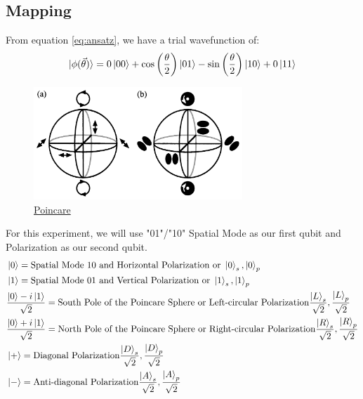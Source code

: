 \documentclass{article}
\begin{document}
\subsection{Mapping}
From equation \eqref{eq:ansatz}, we have a trial wavefunction of:
\begin{equation}
	|\phi(\vec{\theta})\rangle = 0\ket{00} + \cos\left(\frac{\theta}{2}\right)|01\rangle - \sin\left(\frac{\theta}{2}\right)|10\rangle + 0\ket{11}
\end{equation}
\begin{figure}[H]
	\centering
	\includegraphics[width=0.7\textwidth, height=0.3\textheight]{poincare.jpeg}
	\caption{\href{https://opg.optica.org/ol/fulltext.cfm?uri=ol-24-7-430&id=37205}{Poincare}}
\end{figure}
For this experiment, we will use "01"/"10" Spatial Mode as our first qubit and Polarization as our second qubit.
\begin{align*}
	 & \ket{0} = \text{Spatial Mode 10 and Horizontal Polarization or } \ket{0}_s, \ket{0}_p                                                                              \\
	 & \ket{1} = \text{Spatial Mode 01 and Vertical Polarization or } \ket{1}_s, \ket{1}_p                                                                                \\
	 & \frac{\ket{0}-i\ket{1}}{\sqrt{2}} = \text{South Pole of the Poincare Sphere or Left-circular Polarization} \frac{\ket{L}_s}{\sqrt{2}}, \frac{\ket{L}_p}{\sqrt{2}}  \\
	 & \frac{\ket{0}+i\ket{1}}{\sqrt{2}} = \text{North Pole of the Poincare Sphere or Right-circular Polarization} \frac{\ket{R}_s}{\sqrt{2}}, \frac{\ket{R}_p}{\sqrt{2}} \\
	 & \ket{+} = \text{Diagonal Polarization} \frac{\ket{D}_s}{\sqrt{2}}, \frac{\ket{D}_p}{\sqrt{2}}                                                                      \\
	 & \ket{-} = \text{Anti-diagonal Polarization} \frac{\ket{A}_s}{\sqrt{2}}, \frac{\ket{A}_p}{\sqrt{2}}
\end{align*}
\end{document}
